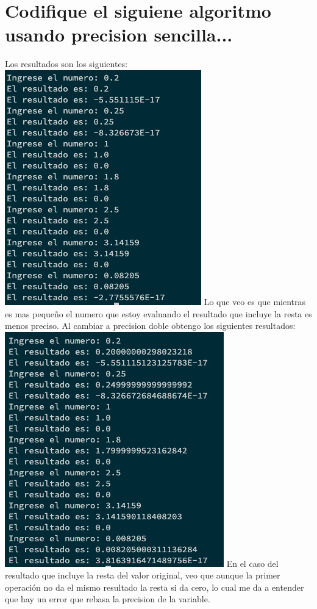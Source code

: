 \documentclass{article}
\begin{document}
\section{Codifique el siguiene algoritmo usando precision sencilla...}
Los resultados son los siguientes:
\linebreak
\includegraphics[scale=0.75]{resultadosAlgoritmoSencilla.png}
\linebreak
Lo que veo es que mientras es mas pequeño el numero que estoy evaluando el resultado que incluye la resta es menos preciso.
Al cambiar a precision doble obtengo los siguientes resultados:
\linebreak
\includegraphics[scale=0.75]{resultadoAlgoritmoPrecisionDoble.png}
\linebreak
En el caso del resultado que incluye la resta del valor original, veo que aunque la primer operación no da el mismo resultado la resta si da cero, lo cual me da a entender que hay un error que rebasa la precision de la variable.
\end{document}
